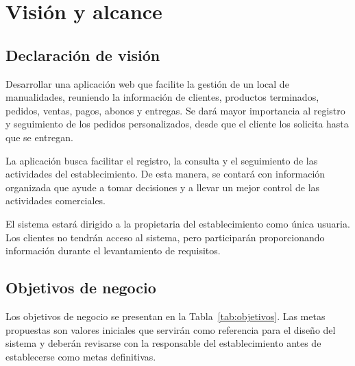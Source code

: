 \documentclass[11pt,a4paper]{article}
\begin{document}
	
	\section{Visión y alcance}
	
	\subsection{Declaración de visión}
	
	Desarrollar una aplicación web que facilite la gestión de un local de manualidades, reuniendo la información de clientes, productos terminados, pedidos, ventas, pagos, abonos y entregas. Se dará mayor importancia al registro y seguimiento de los pedidos personalizados, desde que el cliente los solicita hasta que se entregan.
	
	La aplicación busca facilitar el registro, la consulta y el seguimiento de las actividades del establecimiento. De esta manera, se contará con información organizada que ayude a tomar decisiones y a llevar un mejor control de las actividades comerciales.
	
	El sistema estará dirigido a la propietaria del establecimiento como única usuaria. Los clientes no tendrán acceso al sistema, pero participarán proporcionando información durante el levantamiento de requisitos.
	
	\subsection{Objetivos de negocio}
	
	Los objetivos de negocio se presentan en la Tabla~\ref{tab:objetivos}. Las metas propuestas son valores iniciales que servirán como referencia para el diseño del sistema y deberán revisarse con la responsable del establecimiento antes de establecerse como metas definitivas.
	
\end{document}
